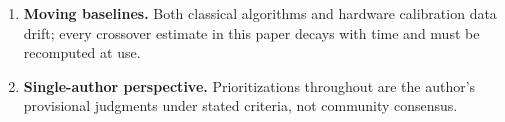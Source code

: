 \begin{enumerate}
  \item \textbf{Moving baselines.} Both classical algorithms and hardware calibration data drift; every crossover estimate in this paper decays with time and must be recomputed at use.
  \item \textbf{Single-author perspective.} Prioritizations throughout are the author's provisional judgments under stated criteria, not community consensus.
\end{enumerate}
